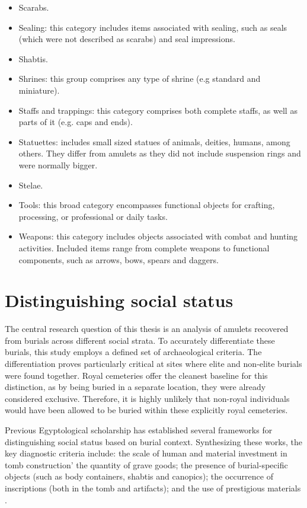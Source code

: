 \begin{itemize}
	\item Scarabs.
	\item Sealing: this category includes items associated with sealing, such as seals (which were not described as scarabs) and seal impressions.
	\item Shabtis.
	\item Shrines: this group comprises any type of shrine (e.g standard and miniature).
	\item Staffs and trappings: this category comprises both complete staffs, as well as parts of it (e.g. caps and ends).
	\item Statuettes: includes small sized statues of animals, deities, humans, among others. They differ from amulets as they did not include suspension rings and were normally bigger.
	\item Stelae.
	\item Tools: this broad category encompasses functional objects for crafting, processing, or professional or daily tasks.
	\item Weapons: this category includes objects associated with combat and hunting activities. Included items range from complete weapons to functional components, such as arrows, bows, spears and daggers.
\end{itemize}


\section{Distinguishing social status}


The central research question of this thesis is an analysis of amulets recovered from burials across different social strata. To accurately differentiate these burials, this study employs a defined set of archaeological criteria. The differentiation proves particularly critical at sites where elite and non-elite burials were found together. Royal cemeteries offer the cleanest baseline for this distinction, as by being buried in a separate location, they were already considered exclusive. Therefore, it is highly unlikely that non-royal individuals would have been allowed to be buried within these explicitly royal cemeteries.


Previous Egyptological scholarship has established several frameworks for distinguishing social status based on burial context. Synthesizing these works, the key diagnostic criteria include: the scale of human and material investment in tomb construction' the quantity of grave goods; the presence of burial-specific objects (such as body containers, shabtis and canopics); the occurrence of inscriptions (both in the tomb and artifacts); and the use of prestigious materials \parencites{smithIntactTombsSeventeenth1992, richardsSocietyDeathAncient2005, wadaProvincialSocietyCemetery2007, podvinLéquipementTombesIntactes2017, lemosMaterialCultureSocial2017}.


